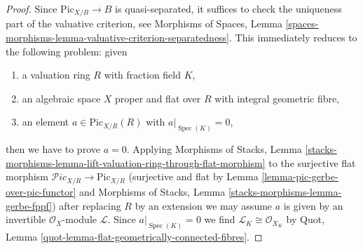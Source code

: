 \documentclass{stacks-project}
\theoremstyle{plain}
\theoremstyle{definition}
\theoremstyle{remark}
\numberwithin{equation}{subsection}
\def\Spec{\mathop{\mathrm{Spec}}}
\def\Picardstack{\mathcal{P}\!\mathit{ic}}
\def\Picardfunctor{\mathrm{Pic}}
\begin{document}
\begin{proof}
Since $\Picardfunctor_{X/B} \to B$ is quasi-separated, it suffices
to check the uniqueness part of the valuative criterion, see
Morphisms of Spaces, Lemma
\ref{spaces-morphisms-lemma-valuative-criterion-separatedness}.
This immediately reduces to the following problem: given
\begin{enumerate}
\item a valuation ring $R$ with fraction field $K$,
\item an algebraic space $X$ proper and flat over $R$
with integral geometric fibre,
\item an element $a \in \Picardfunctor_{X/R}(R)$ with
$a|_{\Spec(K)} = 0$,
\end{enumerate}
then we have to prove $a = 0$. Applying
Morphisms of Stacks, Lemma
\ref{stacks-morphisms-lemma-lift-valuation-ring-through-flat-morphism}
to the surjective flat morphism
$\Picardstack_{X/R} \to \Picardfunctor_{X/R}$
(surjective and flat by Lemma \ref{lemma-pic-gerbe-over-pic-functor} and
Morphisms of Stacks, Lemma \ref{stacks-morphisms-lemma-gerbe-fppf})
after replacing $R$ by an extension we may assume
$a$ is given by an invertible $\mathcal{O}_X$-module
$\mathcal{L}$. Since $a|_{\Spec(K)} = 0$ we find
$\mathcal{L}_K \cong \mathcal{O}_{X_K}$ by
Quot, Lemma \ref{quot-lemma-flat-geometrically-connected-fibres}.


\end{proof}
\end{document}
